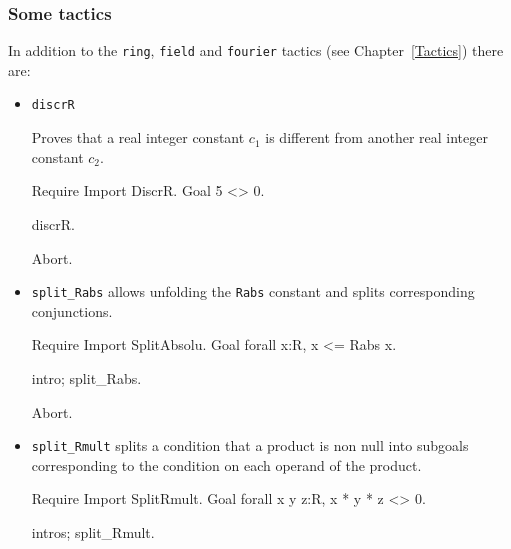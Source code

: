 \subsubsection{Some tactics}

In addition to the \verb|ring|, \verb|field| and \verb|fourier|
tactics (see Chapter~\ref{Tactics}) there are:
\begin{itemize}
\item {\tt discrR} 
  
  Proves that a real integer constant $c_1$ is different from another
  real integer constant $c_2$.  

\begin{coq_example*}
Require Import DiscrR.
Goal 5 <> 0.
\end{coq_example*}

\begin{coq_example}
discrR.
\end{coq_example}

\begin{coq_eval}
Abort.
\end{coq_eval}

\item {\tt split\_Rabs} allows unfolding the {\tt Rabs} constant and splits 
corresponding conjunctions.

\begin{coq_example*}
Require Import SplitAbsolu.
Goal forall x:R, x <= Rabs x.
\end{coq_example*}

\begin{coq_example}
intro; split_Rabs.
\end{coq_example}

\begin{coq_eval}
Abort.
\end{coq_eval}

\item {\tt split\_Rmult} splits a condition that a product is
  non null into subgoals corresponding to the condition on each
  operand of the product. 

\begin{coq_example*}
Require Import SplitRmult.
Goal forall x y z:R, x * y * z <> 0.
\end{coq_example*}

\begin{coq_example}
intros; split_Rmult.
\end{coq_example}

\end{itemize}

